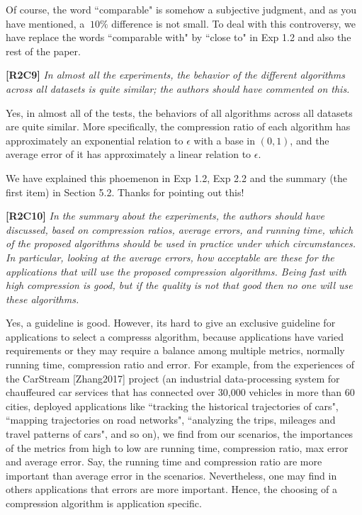 \documentclass{letter}
\begin{document}
Of course, the word ``comparable" is somehow a subjective judgment, and as you have mentioned, a $~10\%$ difference is not small. To deal with this controversy, we have replace the words ``comparable with" by ``close to" in Exp 1.2 and also the rest of the paper.


\textbf{[R2C9]} \emph{In almost all the experiments, the behavior of the different algorithms across all datasets is quite similar; the authors should have commented on this.}

Yes, in almost all of the tests, the behaviors of all algorithms across all datasets are quite similar. More specifically, the compression ratio of each algorithm has approximately an exponential relation to $\epsilon$ with a base in $(0,1)$, and the average error of it has approximately a linear relation to $\epsilon$. 

We have explained this phoemenon in Exp 1.2, Exp 2.2 and the summary (the first item) in Section 5.2. Thanks for pointing out this!


\textbf{[R2C10]} \emph{In the summary about the experiments, the authors should have discussed, based on compression ratios, average errors, and running time, which of the proposed algorithms should be used in practice under which circumstances. In particular, looking at the average errors, how acceptable are these for the applications that will use the proposed compression algorithms. Being fast with high compression is good, but if the quality is not that good then no one will use these algorithms.}

Yes, a guideline is good. However, its hard to give an exclusive guideline for applications to select a compresss algorithm, because applications have varied requirements or they may require a balance among multiple metrics, normally running time, compression ratio and  error. For example, from the experiences of the CarStream [Zhang2017] project (an industrial data-processing system for chauffeured car services that has connected over 30,000 vehicles in more than 60 cities, deployed applications like ``tracking the historical trajectories of cars", ``mapping trajectories on road networks", ``analyzing the trips, mileages and travel patterns of cars", and so on), we find from our scenarios,  the importances of the metrics from high to low are running time, compression ratio, max error and average error. Say, the running time and compression ratio are more important than average error in the scenarios.
Nevertheless, one may find in others applications that errors are more important.
Hence, the choosing of a compression algorithm is application specific.
\end{document}
